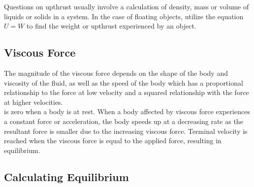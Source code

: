 \documentclass[../main]{subfiles}
\begin{document}



	Questions on upthrust usually involve a calculation of density, mass or volume of liquids or solids in a system. In the case of floating objects, utilize the equation \(U = W\) to find the weight or upthrust experienced by an object.

	\subsection{Viscous Force}


	The magnitude of the viscous force depends on the shape of the body and viscosity of the fluid, as well as the speed of the body which has a proportional relationship to the force at low velocity and a squared relationship with the force at higher velocities. \\

	 is zero when a body is at rest. When a body affected by viscous force experiences a constant force or acceleration, the body speeds up at a decreasing rate as the resultant force is smaller due to the increasing viscous force. Terminal velocity is reached when the viscous force is equal to the applied force, resulting in equilibrium.


	\subsection{Calculating Equilibrium}
\end{document}
